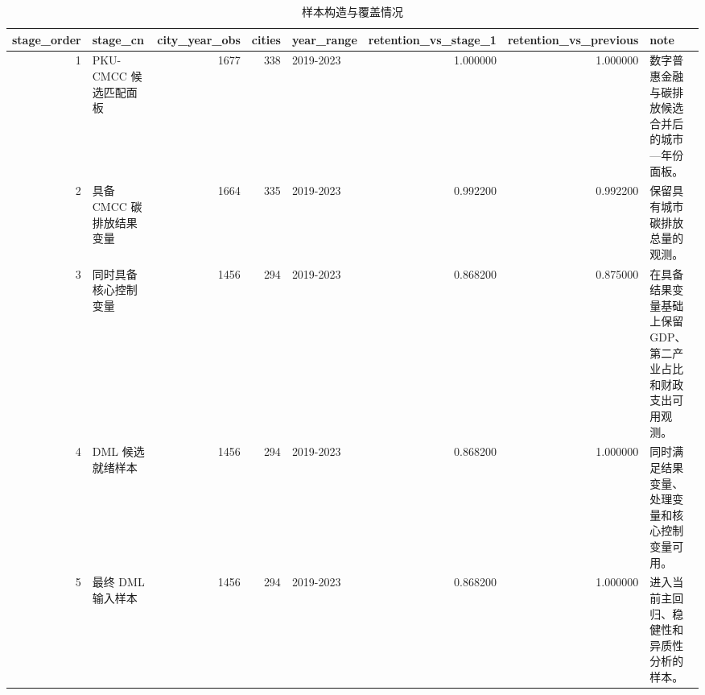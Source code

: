 \begin{table}
\caption{样本构造与覆盖情况}
\label{tab:sample_construction_coverage}
\begin{tabular}{rlrrlrrl}
\toprule
stage_order & stage_cn & city_year_obs & cities & year_range & retention_vs_stage_1 & retention_vs_previous & note \\
\midrule
1 & PKU-CMCC 候选匹配面板 & 1677 & 338 & 2019-2023 & 1.000000 & 1.000000 & 数字普惠金融与碳排放候选合并后的城市—年份面板。 \\
2 & 具备 CMCC 碳排放结果变量 & 1664 & 335 & 2019-2023 & 0.992200 & 0.992200 & 保留具有城市碳排放总量的观测。 \\
3 & 同时具备核心控制变量 & 1456 & 294 & 2019-2023 & 0.868200 & 0.875000 & 在具备结果变量基础上保留 GDP、第二产业占比和财政支出可用观测。 \\
4 & DML 候选就绪样本 & 1456 & 294 & 2019-2023 & 0.868200 & 1.000000 & 同时满足结果变量、处理变量和核心控制变量可用。 \\
5 & 最终 DML 输入样本 & 1456 & 294 & 2019-2023 & 0.868200 & 1.000000 & 进入当前主回归、稳健性和异质性分析的样本。 \\
\bottomrule
\end{tabular}
\end{table}
